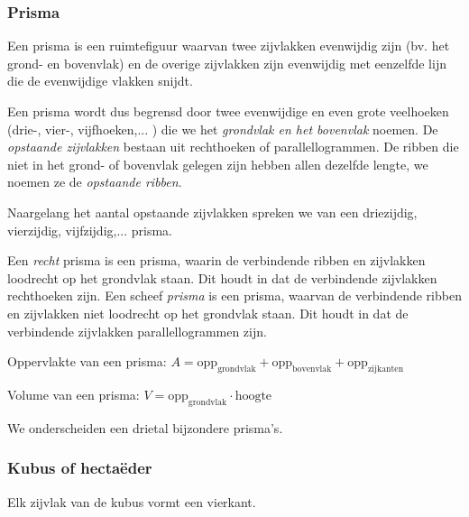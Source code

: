 \subsubsection{Prisma}
\begin{definitie}
	Een prisma is een ruimtefiguur waarvan twee zijvlakken evenwijdig zijn (bv. het grond- en bovenvlak) en de overige zijvlakken zijn evenwijdig met eenzelfde lijn die de evenwijdige vlakken snijdt.
\end{definitie} 
Een prisma wordt dus begrensd door twee evenwijdige en even grote veelhoeken (drie-, vier-, vijfhoeken,... ) die we het \emph{grondvlak en het bovenvlak} noemen. De \emph{opstaande zijvlakken} bestaan uit rechthoeken of parallellogrammen. De ribben die niet in het grond- of bovenvlak gelegen zijn hebben allen dezelfde lengte, we noemen ze de \emph{opstaande ribben}.

Naargelang het aantal opstaande zijvlakken spreken we van een driezijdig, vierzijdig, vijfzijdig,... prisma.

Een \emph{recht} prisma is een prisma, waarin de verbindende ribben en zijvlakken loodrecht op het grondvlak staan. Dit houdt in dat de verbindende zijvlakken rechthoeken zijn. Een scheef \emph{prisma} is een prisma, waarvan de verbindende ribben en zijvlakken niet loodrecht op het grondvlak staan. Dit houdt in dat de verbindende zijvlakken parallellogrammen zijn.


		
\begin{ftonthoud}
		Oppervlakte van een prisma: $A=\text{opp}_{\text{grondvlak}}+\text{opp}_{\text{bovenvlak}}+\text{opp}_{\text{zijkanten}}$
		
		Volume van een prisma: $V=\text{opp}_{\text{grondvlak}}\cdot \text{hoogte}$
	
\end{ftonthoud}

We onderscheiden een drietal bijzondere prisma's.

\subsubsection{Kubus of hecta\"eder}
\begin{definitie}
	Elk zijvlak van de kubus vormt een vierkant.
\end{definitie}

